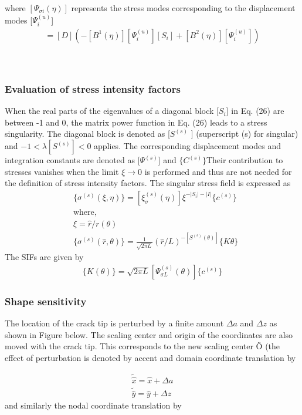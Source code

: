 \documentclass[12pt]{article}
\begin{document}
where $[\varPsi_{\sigma i}(\eta)]$ represents the stress modes corresponding to the displacement modes [$\varPsi_{i}^{(u)}$]
\begin{align*}
    [\varPsi_{\sigma i}(\eta)] = [D](-[B^1(\eta)][\varPsi_{i}^{(u)}][S_i]+[B^2(\eta)][\varPsi_i^{(u)}]) \tag{27}
\end{align*}
\\\\
\subsubsection{Evaluation of stress intensity factors}
When the real parts of the eigenvalues of a diagonal block [$S_i$] in Eq. (26) are between -1 and 0, the matrix power function
in Eq. (26) leads to a stress singularity. The diagonal block is denoted as [$S ^{(s)}$ ] (superscript (s) for singular) and
$-1 < \lambda[S^{(s)}] < 0$ applies. The corresponding displacement modes and integration constants are denoted as [$\varPsi^{(s)}$] and
$\{C^{(s)}\}$Their contribution to stresses
vanishes when the limit $\xi \rightarrow 0$ is performed and thus are not needed for the definition of stress intensity factors. The singular
stress field is expressed as
\begin{align*}
    &\{\sigma^{(s)}(\xi, \eta)\} = [\xi_{\sigma}^{(s)}(\eta)]\xi^{-|S_i| - |I|}\{c^{(s)}\}\\
    &\text{where,}\\
    &\xi = \hat{r}/r(\theta)\\
    &\{\sigma^{(s)}(\hat{r}, \theta)\} = \frac{1}{\sqrt{2\pi L}}(\hat{r}/L)^{-[S^{(s)}(\theta)]}\{K\theta\}
\end{align*}
The SIFs are given by
\begin{align*}
    \{K(\theta)\} = \sqrt{2 \pi L}[\varPsi_{\sigma L}^{(s)}(\theta)]\{c^{(s)}\}
\end{align*}
\subsubsection{Shape sensitivity}
The location of the crack tip is perturbed by a finite amount $\Delta a$ and $\Delta z$ as shown in Figure below. The scaling center and origin of
the coordinates are also moved with the crack tip. This corresponds to the new scaling center Õ (the effect of perturbation is
denoted by accent  and domain coordinate translation by


\begin{align*}
    \tilde{\hat{x}} = \hat{x} + \Delta a\\
    \tilde{\hat{y}} = \hat{y} + \Delta z
\end{align*}
and similarly the nodal coordinate translation by
\end{document}
